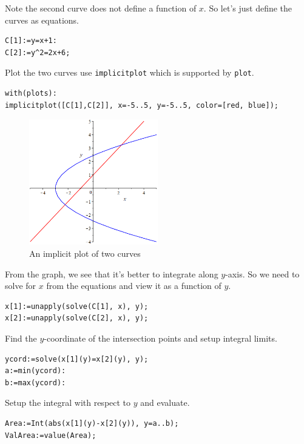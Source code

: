 \documentclass[
  en,11pt,simple]{elegantbook}
\begin{document}
\begin{solution}
{}
Note the second curve does not define a function of \(x\). So let's just define the curves as equations.

\begin{verbatim}
C[1]:=y=x+1:
C[2]:=y^2=2x+6;
\end{verbatim}

Plot the two curves use \texttt{implicitplot} which is supported by \texttt{plot}.

\begin{verbatim}
with(plots):
implicitplot([C[1],C[2]], x=-5..5, y=-5..5, color=[red, blue]);
\end{verbatim}

\begin{figure}
\centering
\includegraphics[width=0.5\textwidth,height=\textheight]{figs/Area-between-two-curves-y.png}
\caption{An implicit plot of two curves}
\end{figure}

From the graph, we see that it's better to integrate along \(y\)-axis. So we need to solve for \(x\) from the equations and view it as a function of \(y\).

\begin{verbatim}
x[1]:=unapply(solve(C[1], x), y);
x[2]:=unapply(solve(C[2], x), y);
\end{verbatim}

Find the \(y\)-coordinate of the intersection points and setup integral limits.

\begin{verbatim}
ycord:=solve(x[1](y)=x[2](y), y);
a:=min(ycord):
b:=max(ycord):
\end{verbatim}

Setup the integral with respect to \(y\) and evaluate.

\begin{verbatim}
Area:=Int(abs(x[1](y)-x[2](y)), y=a..b);
ValArea:=value(Area);
\end{verbatim}
\end{solution}
\end{document}
